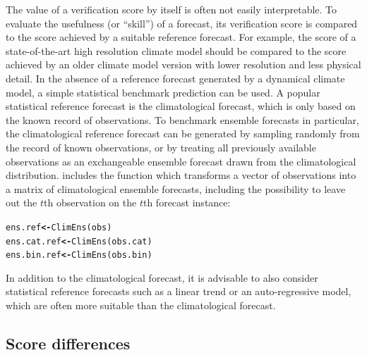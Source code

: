 \documentclass[article]{jss}\usepackage[]{graphicx}\usepackage[]{color}
\makeatletter
\newcommand{\hlstd}[1]{\textcolor[rgb]{0,0,0}{#1}}%
\newcommand{\hlkwb}[1]{\textcolor[rgb]{0.502,0.502,0.753}{\textbf{#1}}}%
\newcommand{\hlkwd}[1]{\textcolor[rgb]{0,0.267,0.4}{#1}}%
\newenvironment{kframe}{%
 \def\at@end@of@kframe{}%
 \ifinner\ifhmode%
  \def\at@end@of@kframe{\end{minipage}}%
  \begin{minipage}{\columnwidth}%
 \fi\fi%
 \def\FrameCommand##1{\hskip\@totalleftmargin \hskip-\fboxsep
 \colorbox{shadecolor}{##1}\hskip-\fboxsep
     \hskip-\linewidth \hskip-\@totalleftmargin \hskip\columnwidth}%
 \MakeFramed {\advance\hsize-\width
   \@totalleftmargin\z@ \linewidth\hsize
   \@setminipage}}%
 {\par\unskip\endMakeFramed%
 \at@end@of@kframe}
\newenvironment{knitrout}{}{} %
\makeatother
\begin{document}
The value of a verification score by itself is often not easily interpretable.
To evaluate the usefulness (or ``skill'') of a forecast, its verification score is compared to the score achieved by a suitable reference forecast.
For example, the score of a state-of-the-art high resolution climate model should be compared to the score achieved by an older climate model version with lower resolution and less physical detail.
In the absence of a reference forecast generated by a dynamical climate model, a simple statistical benchmark prediction can be used.
A popular statistical reference forecast is the climatological forecast, which is only based on the known record of observations.
To benchmark ensemble forecasts in particular, the climatological reference forecast can be generated by sampling randomly from the record of known observations, or by treating all previously available observations as an exchangeable ensemble forecast drawn from the climatological distribution.
 includes the function  which transforms a vector of observations into a matrix of climatological ensemble forecasts, including the possibility to leave out the $t$th observation on the $t$th forecast instance:
%
\begin{knitrout}
\color{fgcolor}\begin{kframe}
\begin{alltt}
\hlstd{ens.ref}     \hlkwb{<-} \hlkwd{ClimEns}\hlstd{(obs)}
\hlstd{ens.cat.ref} \hlkwb{<-} \hlkwd{ClimEns}\hlstd{(obs.cat)}
\hlstd{ens.bin.ref} \hlkwb{<-} \hlkwd{ClimEns}\hlstd{(obs.bin)}
\end{alltt}
\end{kframe}
\end{knitrout}
%
In addition to the climatological forecast, it is advisable to also consider statistical reference forecasts such as a linear trend or an auto-regressive model, which are often more suitable than the climatological forecast.



\subsection{Score differences}
\end{document}

